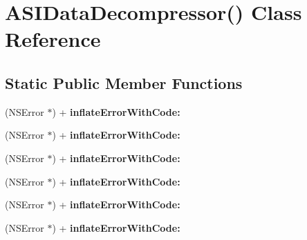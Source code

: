 \hypertarget{interface_a_s_i_data_decompressor_07_08}{
\section{\-A\-S\-I\-Data\-Decompressor() \-Class \-Reference}
\label{interface_a_s_i_data_decompressor_07_08}
}
\subsection*{\-Static \-Public \-Member \-Functions}
\begin{DoxyCompactItemize}
\item 
\hypertarget{interface_a_s_i_data_decompressor_07_08_af9f7937d26855a8efc23746814706011}{
(\-N\-S\-Error $\ast$) + {\bfseries inflate\-Error\-With\-Code\-:}}
\label{interface_a_s_i_data_decompressor_07_08_af9f7937d26855a8efc23746814706011}

\item 
\hypertarget{interface_a_s_i_data_decompressor_07_08_af9f7937d26855a8efc23746814706011}{
(\-N\-S\-Error $\ast$) + {\bfseries inflate\-Error\-With\-Code\-:}}
\label{interface_a_s_i_data_decompressor_07_08_af9f7937d26855a8efc23746814706011}

\item 
\hypertarget{interface_a_s_i_data_decompressor_07_08_af9f7937d26855a8efc23746814706011}{
(\-N\-S\-Error $\ast$) + {\bfseries inflate\-Error\-With\-Code\-:}}
\label{interface_a_s_i_data_decompressor_07_08_af9f7937d26855a8efc23746814706011}

\item 
\hypertarget{interface_a_s_i_data_decompressor_07_08_af9f7937d26855a8efc23746814706011}{
(\-N\-S\-Error $\ast$) + {\bfseries inflate\-Error\-With\-Code\-:}}
\label{interface_a_s_i_data_decompressor_07_08_af9f7937d26855a8efc23746814706011}

\item 
\hypertarget{interface_a_s_i_data_decompressor_07_08_af9f7937d26855a8efc23746814706011}{
(\-N\-S\-Error $\ast$) + {\bfseries inflate\-Error\-With\-Code\-:}}
\label{interface_a_s_i_data_decompressor_07_08_af9f7937d26855a8efc23746814706011}

\item 
\hypertarget{interface_a_s_i_data_decompressor_07_08_af9f7937d26855a8efc23746814706011}{
(\-N\-S\-Error $\ast$) + {\bfseries inflate\-Error\-With\-Code\-:}}
\label{interface_a_s_i_data_decompressor_07_08_af9f7937d26855a8efc23746814706011}


\end{DoxyCompactItemize}
